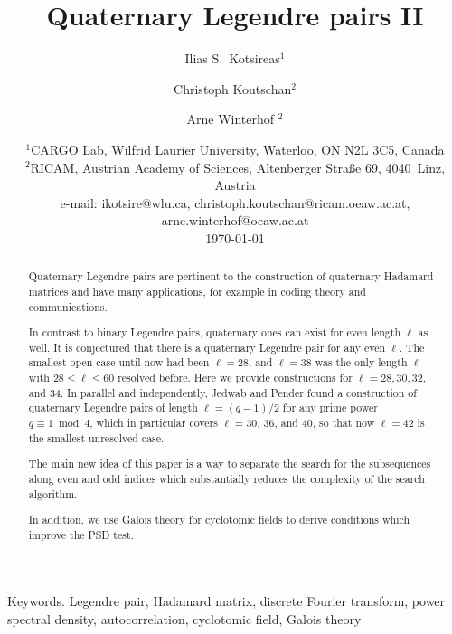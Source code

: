 \documentclass{article}
\theoremstyle{definition}
\newcommand{\aw}[1]{{\color{magenta} #1}}
\begin{document}
\title{Quaternary Legendre pairs II}

\author{Ilias S.~Kotsireas$^1$
  \and Christoph Koutschan$^2$
  \and Arne Winterhof $^2$}
\date{{\normalsize
  $^1$CARGO Lab, Wilfrid Laurier University, Waterloo, ON N2L 3C5, Canada\\
  $^2$RICAM, Austrian Academy of Sciences, Altenberger Stra\ss e  69, 4040~Linz, Austria\\
  e-mail: ikotsire@wlu.ca, christoph.koutschan@ricam.oeaw.ac.at,
  arne.winterhof@oeaw.ac.at}\\[2ex]
  \today}

\maketitle

\begin{abstract}
Quaternary Legendre pairs are pertinent to the construction of quaternary Hadamard matrices and have many applications, for example in coding theory and communications.

In contrast to binary Legendre pairs, quaternary ones can exist for even length $\ell$ as well.
It is conjectured that there is a quaternary Legendre pair for any even $\ell$. The smallest open case until now had been $\ell=28$, and $\ell=38$ was the only length $\ell$ with $28\le \ell\le 60$ resolved before. Here we provide constructions for $\ell=28,30,32$, and $34$. 
In parallel and independently, Jedwab and Pender found a construction of quaternary Legendre pairs of length $\ell=(q-1)/2$ for any prime power $q\equiv 1\bmod 4$, which in particular covers $\ell=30$, $36$, and $40$, so that now $\ell=42$ is the smallest unresolved case.

The main new idea of this paper is a way to separate the search for the subsequences along even and odd indices which substantially reduces the complexity of the search algorithm. 

In addition, we use Galois theory for cyclotomic fields to derive conditions which improve the PSD test.
\end{abstract}

Keywords. Legendre pair, Hadamard matrix, discrete Fourier transform, power spectral density, autocorrelation, cyclotomic field, Galois theory
\end{document}
